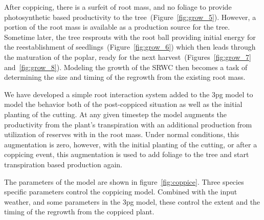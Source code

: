 \documentclass[10pt]{article}
\begin{document}
After coppicing, there is a surfeit of root mass, and no foliage to
provide photosynthetic based productivity to the
tree~(Figure~\ref{fig:grow_5}).  However, a portion of the root mass
is available as a production source for the tree.  Sometime later, the
tree resprouts with the root ball providing initial energy for the
reestablishment of seedlings~(Figure~\ref{fig:grow_6}) which then
leads through the maturation of the poplar, ready for the next
harvest~(Figures~\ref{fig:grow_7} and~\ref{fig:grow_8}).  Modeling the
growth of the \ac{SRWC} then becomes a task of determining the size
and timing of the regrowth from the existing root mass.

We have developed a simple root interaction system added to the
\ac{3pg} model to model the behavior both of the post-coppiced
situation as well as the initial planting of the cutting. At any given
timestep the model augments the productivity from the plant's
transpiration with an additional production from utilization of
reserves with in the root mass.  Under normal conditions, this
augmentation is zero, however, with the initial planting of the
cutting, or after a coppicing event, this augmentation is used to add
foliage to the tree and start transpiration based production again.

The parameters of the model are shown in figure~\ref{fig:coppice}.  Three
species specific parameters control the coppicing model.  Combined
with the input weather, and some parameters in the \ac{3pg} model,
these control the extent and the timing of the regrowth from the
coppiced plant.
\end{document}
